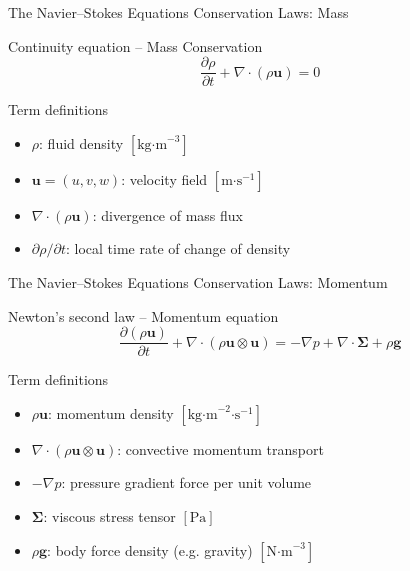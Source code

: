\begin{frame}{The Navier--Stokes Equations}
\small
\textcolor{red_unipd}{\Large Conservation Laws: Mass}

\vspace{0.8em}

\begin{alertblock}{Continuity equation -- Mass Conservation}
\[
\dfrac{\partial \rho}{\partial t} + \nabla\!\cdot\!(\rho \mathbf{u}) = 0
\]
\end{alertblock}

\begin{block}{Term definitions}
\begin{itemize}
  \item \(\rho\): fluid density \([\text{kg·m}^{-3}]\)
  \item \(\mathbf{u} = (u,v,w)\): velocity field \([\text{m·s}^{-1}]\)
  \item \(\nabla\!\cdot\!(\rho \mathbf{u})\): divergence of mass flux
  \item \(\partial \rho / \partial t\): local time rate of change of density
\end{itemize}
\end{block}
\end{frame}




\begin{frame}{The Navier--Stokes Equations}
\small
\textcolor{red_unipd}{\Large Conservation Laws: Momentum}

\vspace{0.8em}

\begin{alertblock}{Newton’s second law -- Momentum equation}
\[
\dfrac{\partial (\rho \mathbf{u})}{\partial t}
+ \nabla\!\cdot\!(\rho \mathbf{u}\otimes\mathbf{u})
= -\nabla p + \nabla\!\cdot\!\boldsymbol{\Sigma} + \rho \mathbf{g}
\]
\end{alertblock}

\begin{block}{Term definitions}
\begin{itemize}
  \item \(\rho \mathbf{u}\): momentum density \([\text{kg·m}^{-2}\text{·s}^{-1}]\)
  \item \(\nabla\!\cdot\!(\rho \mathbf{u}\otimes\mathbf{u})\): convective momentum transport
  \item \(-\nabla p\): pressure gradient force per unit volume
  \item \(\boldsymbol{\Sigma}\): viscous stress tensor \([\text{Pa}]\)
  \item \(\rho \mathbf{g}\): body force density (e.g. gravity) \([\text{N·m}^{-3}]\)
\end{itemize}
\end{block}
\end{frame}




